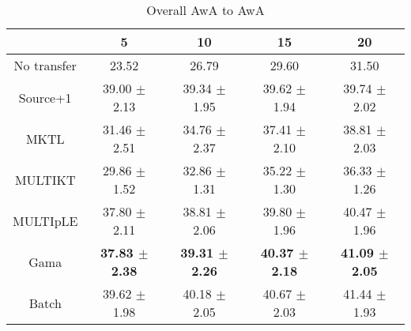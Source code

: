 \begin{table}[htbp]
  \centering
  \caption{Overall AwA to AwA}
    \begin{tabular}{ccccc}
    \toprule
          & 5     & 10    & 15    & 20 \\
    \midrule
    No transfer &         23.52  &         26.79  &         29.60  &         31.50  \\
    Source+1    &         39.00 $\pm$ 2.13 &         39.34 $\pm$ 1.95 &         39.62 $\pm$ 1.94 &         39.74 $\pm$ 2.02 \\
    MKTL        &         31.46 $\pm$ 2.51 &         34.76 $\pm$ 2.37 &         37.41 $\pm$ 2.10 &         38.81 $\pm$ 2.03 \\
    MULTIKT     &         29.86 $\pm$ 1.52 &         32.86 $\pm$ 1.31 &         35.22 $\pm$ 1.30 &         36.33 $\pm$ 1.26 \\
    MULTIpLE    &         37.80 $\pm$ 2.11 &         38.81 $\pm$ 2.06 &         39.80 $\pm$ 1.96 &         40.47 $\pm$ 1.96 \\
    Gama        &        \textbf{37.83 $\pm$ 2.38} &         \textbf{39.31 $\pm$ 2.26} &         \textbf{40.37 $\pm$ 2.18} &         \textbf{41.09 $\pm$ 2.05} \\
    Batch       &         39.62 $\pm$ 1.98 &         40.18 $\pm$ 2.05 &         40.67 $\pm$ 2.03 &         41.44 $\pm$ 1.93 \\
    \bottomrule
    \end{tabular}%
  \label{tab:addlabel}%
\end{table}%



